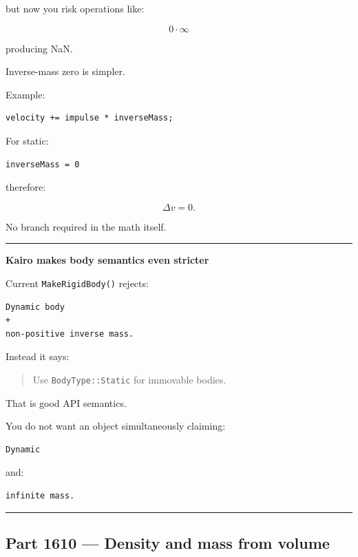 but now you risk operations like:

\[
0\cdot\infty
\]

producing NaN.

Inverse-mass zero is simpler.

Example:

\begin{verbatim}
velocity += impulse * inverseMass;
\end{verbatim}

For static:

\begin{verbatim}
inverseMass = 0
\end{verbatim}

therefore:

\[
\Delta v=0.
\]

No branch required in the math itself.

\begin{center}\rule{0.5\linewidth}{0.5pt}\end{center}

\textbf{Kairo makes body semantics even stricter}

Current \texttt{MakeRigidBody()} rejects:

\begin{verbatim}
Dynamic body
+
non-positive inverse mass.
\end{verbatim}

Instead it says:

\begin{quote}
Use \texttt{BodyType::Static} for immovable bodies.
\end{quote}

That is good API semantics.

You do not want an object simultaneously claiming:

\begin{verbatim}
Dynamic
\end{verbatim}

and:

\begin{verbatim}
infinite mass.
\end{verbatim}

\begin{center}\rule{0.5\linewidth}{0.5pt}\end{center}

\subsection{Part 1610 --- Density and mass from volume}\label{06-engine-ii-ch034-part-1610-density-and-mass-from-volume}

